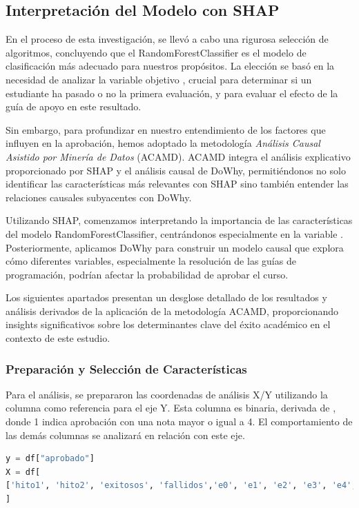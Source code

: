 \subsection{Interpretación del Modelo con SHAP}

En el proceso de esta investigación, se llevó a cabo una rigurosa selección de algoritmos, concluyendo que el RandomForestClassifier es el modelo de clasificación más adecuado para nuestros propósitos. La elección se basó en la necesidad de analizar la variable objetivo , crucial para determinar si un estudiante ha pasado o no la primera evaluación, y para evaluar el efecto de la guía de apoyo en este resultado.

Sin embargo, para profundizar en nuestro entendimiento de los factores que influyen en la aprobación, hemos adoptado la metodología \textit{Análisis Causal Asistido por Minería de Datos} (ACAMD). ACAMD integra el análisis explicativo proporcionado por SHAP y el análisis causal de DoWhy, permitiéndonos no solo identificar las características más relevantes con SHAP sino también entender las relaciones causales subyacentes con DoWhy.

Utilizando SHAP, comenzamos interpretando la importancia de las características del modelo RandomForestClassifier, centrándonos especialmente en la variable . Posteriormente, aplicamos DoWhy para construir un modelo causal que explora cómo diferentes variables, especialmente la resolución de las guías de programación, podrían afectar la probabilidad de aprobar el curso.

Los siguientes apartados presentan un desglose detallado de los resultados y análisis derivados de la aplicación de la metodología ACAMD, proporcionando insights significativos sobre los determinantes clave del éxito académico en el contexto de este estudio.


\subsubsection{Preparación y Selección de Características}

Para el análisis, se prepararon las coordenadas de análisis X/Y utilizando la columna  como referencia para el eje Y. Esta columna es binaria, derivada de , donde 1 indica aprobación con una nota mayor o igual a 4. El comportamiento de las demás columnas se analizará en relación con este eje.


\begin{lstlisting}[language=Python, caption=Selección de características y variable objetivo para RandomForestClassifier, label=lst:seleccion_caracteristicasRFC]
y = df["aprobado"]
X = df[
['hito1', 'hito2', 'exitosos', 'fallidos','e0', 'e1', 'e2', 'e3', 'e4', 'e5', 'e6', 'e7', 'e8', 'e9', 'e10', 'e11', 'e12', 'e13', 'e14', 'e15', 'e16', 'e17', 'e18', 'e19', 'e20', 'e21', 'e22', 'e23', 'e24', 'e25', 'e26', 'e27', 'e28', 'e29', 'e30', 'e31', 'e32', 'e33', 'e34', 'e35', 'e36', 'e37', 'e38', 'e39', 'e40', 'e41', 'e42', 'e43', 'e44', 'e45', 'e46', 'e47', 'e48', 'e49', 'e50', 'e51', 'e52']
]
\end{lstlisting}

